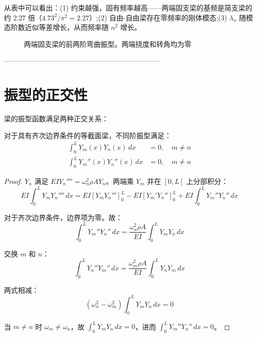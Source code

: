 \begin{remark}
从表中可以看出：(1) 约束越强，固有频率越高——两端固支梁的基频是简支梁的约 2.27 倍（$4.73^2/\pi^2 = 2.27$）;(2) 自由-自由梁存在零频率的刚体模态;(3) $\lambda_n$ 随模态阶数近似等差增长，从而频率随 $n^2$ 增长。
\end{remark}

\begin{figure}[H]\centering
{}
\caption{两端固支梁的前两阶弯曲振型。两端挠度和转角均为零}
\label{fig:beam-cc-modes}
\end{figure}

--------------------------------------------------------------------
\section{振型的正交性}

梁的振型函数满足两种正交关系：

\begin{theorem}[梁振型的正交性]
对于具有齐次边界条件的等截面梁，不同阶振型满足：
\begin{align*}
\int_0^L Y_m(x) Y_n(x)\,dx &= 0, \quad m\neq n \\
\int_0^L Y_m''(x) Y_n''(x)\,dx &= 0, \quad m\neq n
\end{align*}
\end{theorem}

\begin{proof}
$Y_n$ 满足 $EI Y_n'''' = \omega_n^2 \rho A Y_n$。两端乘 $Y_m$ 并在 $[0,L]$ 上分部积分：
\[
EI\int_0^L Y_m Y_n''''\,dx = EI\left[Y_m Y_n'''\right]_0^L - EI\left[Y_m' Y_n''\right]_0^L + EI\int_0^L Y_m'' Y_n''\,dx
\]

对于齐次边界条件，边界项为零。故：
\[
\int_0^L Y_m'' Y_n''\,dx = \frac{\omega_n^2 \rho A}{EI}\int_0^L Y_m Y_n\,dx
\]

交换 $m$ 和 $n$：
\[
\int_0^L Y_n'' Y_m''\,dx = \frac{\omega_m^2 \rho A}{EI}\int_0^L Y_n Y_m\,dx
\]

两式相减：
\[
(\omega_n^2 - \omega_m^2)\int_0^L Y_m Y_n\,dx = 0
\]

当 $m\neq n$ 时 $\omega_m\neq\omega_n$，故 $\int_0^L Y_m Y_n\,dx = 0$，进而 $\int_0^L Y_m'' Y_n''\,dx = 0$。
\end{proof}

